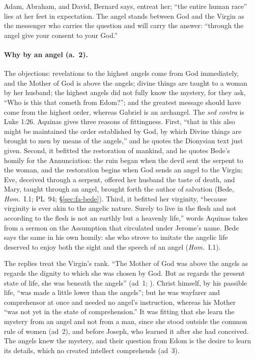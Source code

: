 \noindent Adam, Abraham, and David, Bernard says, entreat her; ``the entire
human race'' lies at her feet in expectation. The angel stands between God
and the Virgin as the messenger who carries the question and will carry the
answer: ``through the angel give your consent to your God.''

\paragraph{Why by an angel (a.~2).} The objections: revelations to the
highest angels come from God immediately, and the Mother of God is above
the angels; divine things are taught to a woman by her husband; the highest
angels did not fully know the mystery, for they ask, ``Who is this that
cometh from Edom?''; and the greatest message should have come from the
highest order, whereas Gabriel is an archangel. The \emph{sed contra} is
Luke 1:26. Aquinas gives three reasons of fittingness. First, ``that in this
also might be maintained the order established by God, by which Divine
things are brought to men by means of the angels,'' and he quotes the
Dionysian text just given. Second, it befitted the restoration of mankind,
and he quotes Bede's homily for the Annunciation: the ruin began when the
devil sent the serpent to the woman, and the restoration begins when God
sends an angel to the Virgin; Eve, deceived through a serpent, offered her
husband the taste of death, and Mary, taught through an angel, brought forth
the author of salvation (Bede, \emph{Hom.}\ I.1; PL~94;
\S\ref{sec:fa-bede}). Third, it befitted her virginity, ``because
virginity is ever akin to the angelic nature. Surely to live in the flesh
and not according to the flesh is not an earthly but a heavenly life,''
words Aquinas takes from a sermon on the Assumption that circulated under
Jerome's name. Bede says the same in his own homily: she who strove to
imitate the angelic life deserved to enjoy both the sight and the speech of
an angel (\emph{Hom.}\ I.1).

The replies treat the Virgin's rank. ``The Mother of God was above the
angels as regards the dignity to which she was chosen by God. But as
regards the present state of life, she was beneath the angels'' (ad~1;
). Christ himself, by his passible
life, ``was made a little lower than the angels''; but he was wayfarer and
comprehensor at once and needed no angel's instruction, whereas his Mother
``was not yet in the state of comprehension.'' It was fitting that she learn
the mystery from an angel and not from a man, since she stood outside the
common rule of women (ad~2), and before Joseph, who learned it after she had
conceived. The angels knew the mystery, and their question from Edom is the
desire to learn its details, which no created intellect comprehends (ad~3).

